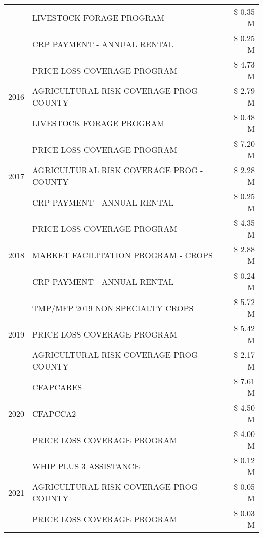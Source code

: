 \begin{tabular}{llr}
 & LIVESTOCK FORAGE PROGRAM & \$ 0.35 M \\
 & CRP PAYMENT - ANNUAL RENTAL & \$ 0.25 M \\
\cline{1-3}
\multirow[t]{3}{*}{2016} & PRICE LOSS COVERAGE PROGRAM & \$ 4.73 M \\
 & AGRICULTURAL RISK COVERAGE PROG - COUNTY & \$ 2.79 M \\
 & LIVESTOCK FORAGE PROGRAM & \$ 0.48 M \\
\cline{1-3}
\multirow[t]{3}{*}{2017} & PRICE LOSS COVERAGE PROGRAM & \$ 7.20 M \\
 & AGRICULTURAL RISK COVERAGE PROG - COUNTY & \$ 2.28 M \\
 & CRP PAYMENT - ANNUAL RENTAL & \$ 0.25 M \\
\cline{1-3}
\multirow[t]{3}{*}{2018} & PRICE LOSS COVERAGE PROGRAM & \$ 4.35 M \\
 & MARKET FACILITATION PROGRAM - CROPS & \$ 2.88 M \\
 & CRP PAYMENT - ANNUAL RENTAL & \$ 0.24 M \\
\cline{1-3}
\multirow[t]{3}{*}{2019} & TMP/MFP 2019 NON SPECIALTY CROPS & \$ 5.72 M \\
 & PRICE LOSS COVERAGE PROGRAM & \$ 5.42 M \\
 & AGRICULTURAL RISK COVERAGE PROG - COUNTY & \$ 2.17 M \\
\cline{1-3}
\multirow[t]{3}{*}{2020} & CFAPCARES & \$ 7.61 M \\
 & CFAPCCA2 & \$ 4.50 M \\
 & PRICE LOSS COVERAGE PROGRAM & \$ 4.00 M \\
\cline{1-3}
\multirow[t]{3}{*}{2021} & WHIP PLUS 3 ASSISTANCE & \$ 0.12 M \\
 & AGRICULTURAL RISK COVERAGE PROG - COUNTY & \$ 0.05 M \\
 & PRICE LOSS COVERAGE PROGRAM & \$ 0.03 M \\
\cline{1-3}
\bottomrule
\end{tabular}
